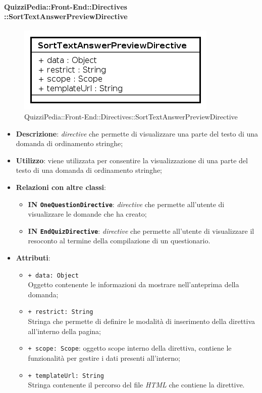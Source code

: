 	\paragraph{QuizziPedia::Front-End::Directives\\::SortTextAnswerPreviewDirective}
		
		\label{QuizziPedia::Front-End::Directives::SortTextAnswerPreviewDirective}
		
		\begin{figure}[ht]
			\centering
			\includegraphics[scale=0.80,keepaspectratio]{UML/Classi/Front-End/QuizziPedia_Front-end_Directives_SortTextAnswerPreviewDirective.png}
			\caption{QuizziPedia::Front-End::Directives::SortTextAnswerPreviewDirective}
		\end{figure} \FloatBarrier
		
		\begin{itemize}
			\item \textbf{Descrizione}: \textit{directive} che permette di visualizzare una parte del testo di una domanda di ordinamento stringhe;
			\item \textbf{Utilizzo}: viene utilizzata per consentire la visualizzazione di una parte del testo di una domanda di ordinamento stringhe;
			\item \textbf{Relazioni con altre classi}: 
			\begin{itemize}
				\item \textbf{IN \texttt{OneQuestionDirective}}: \textit{directive} che permette all'utente di visualizzare le domande che ha creato;
				\item \textbf{IN \texttt{EndQuizDirective}}: \textit{directive} che permette all'utente di visualizzare il resoconto al termine della compilazione di un questionario.
			\end{itemize}
			\item \textbf{Attributi}:
			\begin{itemize}
				\item \texttt{+ data: Object} \\ Oggetto contenente le informazioni da mostrare nell'anteprima della domanda;
		\item \texttt{+ restrict: String} \\ Stringa che permette di definire le modalità di inserimento della direttiva all'interno della pagina;
		\item \texttt{+ scope: Scope}: oggetto scope interno della direttiva, contiene le funzionalità per gestire i dati presenti all'interno;
		\item \texttt{+ templateUrl: String} \\ Stringa contenente il percorso del file \textit{HTML} che contiene la direttive.
			\end{itemize}
		\end{itemize}